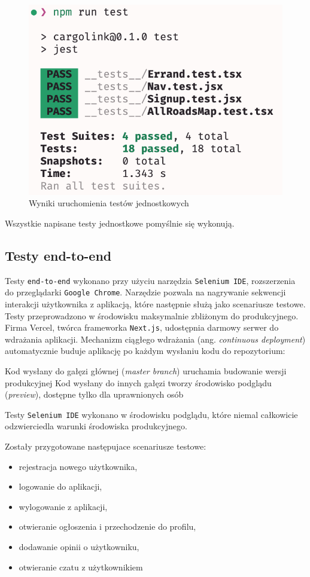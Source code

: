\begin{figure}[H]
	\centering
		\includegraphics[width=0.5\linewidth]{rozdzial2/testy_jednostkowe_wyniki.png}
	\caption{Wyniki uruchomienia testów jednostkowych}
	\label{Testy jednostkowe wyniki}
\end{figure}

Wszystkie napisane testy jednostkowe pomyślnie się wykonują.

\subsection{Testy end-to-end}

Testy \texttt{end-to-end} wykonano przy użyciu narzędzia \texttt{Selenium IDE}, rozszerzenia do przeglądarki \texttt{Google Chrome}. Narzędzie pozwala na nagrywanie sekwencji interakcji użytkownika z aplikacją, które następnie służą jako scenariusze testowe.
Testy przeprowadzono w środowisku maksymalnie zbliżonym do produkcyjnego. Firma Vercel, twórca frameworka \texttt{Next.js}, udostępnia darmowy serwer do wdrażania aplikacji. Mechanizm ciągłego wdrażania (ang. \emph{continuous deployment}) automatycznie buduje aplikację po każdym wysłaniu kodu do repozytorium:

Kod wysłany do gałęzi głównej (\emph{master branch}) uruchamia budowanie wersji produkcyjnej
Kod wysłany do innych gałęzi tworzy środowisko podglądu (\emph{preview}), dostępne tylko dla uprawnionych osób

Testy \texttt{Selenium IDE} wykonano w środowisku podglądu, które niemal całkowicie odzwierciedla warunki środowiska produkcyjnego.

Zostały przygotowane następujace scenariusze testowe:
\begin{itemize}
  \item rejestracja nowego użytkownika,
  \item logowanie do aplikacji,
  \item wylogowanie z aplikacji,
  \item otwieranie ogłoszenia i przechodzenie do profilu,
  \item dodawanie opinii o użytkowniku,
  \item otwieranie czatu z użytkownikiem
\end{itemize}

